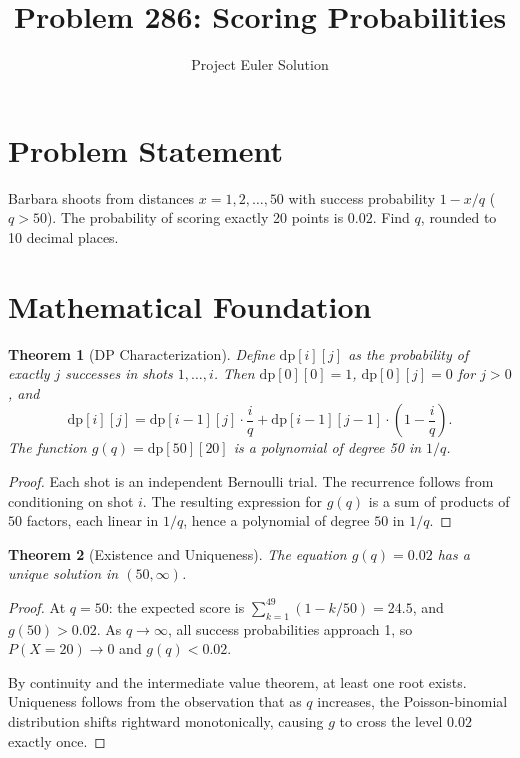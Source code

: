 \documentclass[12pt]{article}
\title{Problem 286: Scoring Probabilities}
\author{Project Euler Solution}
\date{}
\newtheorem{theorem}{Theorem}
\begin{document}
\maketitle

\section{Problem Statement}

Barbara shoots from distances $x = 1, 2, \ldots, 50$ with success probability $1 - x/q$ ($q > 50$). The probability of scoring exactly 20 points is $0.02$. Find $q$, rounded to 10 decimal places.

\section{Mathematical Foundation}

\begin{theorem}[DP Characterization]
Define $\mathrm{dp}[i][j]$ as the probability of exactly $j$ successes in shots $1, \ldots, i$. Then $\mathrm{dp}[0][0] = 1$, $\mathrm{dp}[0][j] = 0$ for $j > 0$, and
\[
\mathrm{dp}[i][j] = \mathrm{dp}[i-1][j] \cdot \frac{i}{q} + \mathrm{dp}[i-1][j-1] \cdot \left(1 - \frac{i}{q}\right).
\]
The function $g(q) = \mathrm{dp}[50][20]$ is a polynomial of degree 50 in $1/q$.
\end{theorem}

\begin{proof}
Each shot is an independent Bernoulli trial. The recurrence follows from conditioning on shot $i$. The resulting expression for $g(q)$ is a sum of products of $50$ factors, each linear in $1/q$, hence a polynomial of degree $50$ in $1/q$.
\end{proof}

\begin{theorem}[Existence and Uniqueness]
The equation $g(q) = 0.02$ has a unique solution in $(50, \infty)$.
\end{theorem}

\begin{proof}
At $q = 50$: the expected score is $\sum_{k=1}^{49}(1 - k/50) = 24.5$, and $g(50) > 0.02$. As $q \to \infty$, all success probabilities approach 1, so $P(X=20) \to 0$ and $g(q) < 0.02$.

By continuity and the intermediate value theorem, at least one root exists. Uniqueness follows from the observation that as $q$ increases, the Poisson-binomial distribution shifts rightward monotonically, causing $g$ to cross the level $0.02$ exactly once.
\end{proof}
\end{document}
